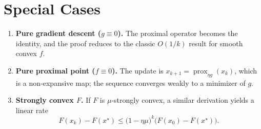\documentclass{article}
\begin{document}
\section*{Special Cases}
\begin{enumerate}[noitemsep]
\item \textbf{Pure gradient descent ($g\equiv0$).}  The proximal operator becomes the identity, and the proof reduces to the classic $O(1/k)$ result for smooth convex $f$.
\item \textbf{Pure proximal point ($f\equiv0$).}  The update is $x_{k+1}= \operatorname{prox}_{\eta g}(x_{k})$, which is a non‑expansive map; the sequence converges weakly to a minimizer of $g$.
\item \textbf{Strongly convex $F$.}  If $F$ is $\mu$‑strongly convex, a similar derivation yields a linear rate
\[
F(x_{k})-F(x^{\star})\le \bigl(1-\eta\mu\bigr)^{k}\bigl(F(x_{0})-F(x^{\star})\bigr).
\]
\end{enumerate}
\end{document}
